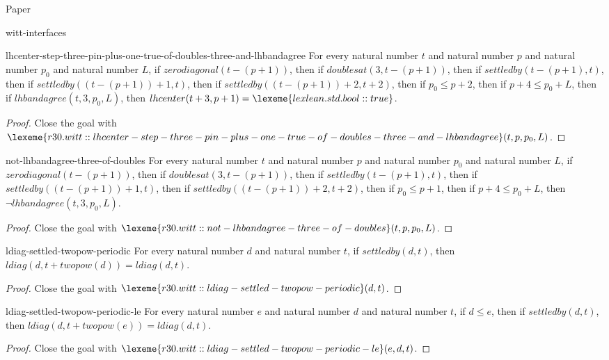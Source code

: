 \begin{lexlean}{Paper}
\begin{section}{witt-interfaces}
  \begin{theorem}{lhcenter-step-three-pin-plus-one-true-of-doubles-three-and-lhbandagree}
  For every natural number \(t\) and natural number \(p\) and natural number \(p_0\) and natural number \(L\), if \(zerodiagonal(t - (p + 1))\), then if \(doublesat(3, t - (p + 1))\), then if \(settledby(t - (p + 1), t)\), then if \(settledby((t - (p + 1)) + 1, t)\), then if \(settledby((t - (p + 1)) + 2, t + 2)\), then if \(p_0 ≤ p + 2\), then if \(p + 4 ≤ p_0 + L\), then if \(lhbandagree(t, 3, p_0, L)\), then \(lhcenter(t + 3, p + 1) = \lexeme{lexlean.std.bool::true}\).
  \begin{proof}
  Close the goal with \(\lexeme{r30.witt::lhcenter-step-three-pin-plus-one-true-of-doubles-three-and-lhbandagree}(t, p, p_0, L)\).
  \end{proof}
  \end{theorem}

  \begin{theorem}{not-lhbandagree-three-of-doubles}
  For every natural number \(t\) and natural number \(p\) and natural number \(p_0\) and natural number \(L\), if \(zerodiagonal(t - (p + 1))\), then if \(doublesat(3, t - (p + 1))\), then if \(settledby(t - (p + 1), t)\), then if \(settledby((t - (p + 1)) + 1, t)\), then if \(settledby((t - (p + 1)) + 2, t + 2)\), then if \(p_0 ≤ p + 1\), then if \(p + 4 ≤ p_0 + L\), then \(¬lhbandagree(t, 3, p_0, L)\).
  \begin{proof}
  Close the goal with \(\lexeme{r30.witt::not-lhbandagree-three-of-doubles}(t, p, p_0, L)\).
  \end{proof}
  \end{theorem}

  \begin{theorem}{ldiag-settled-twopow-periodic}
  For every natural number \(d\) and natural number \(t\), if \(settledby(d, t)\), then \(ldiag(d, t + twopow(d)) = ldiag(d, t)\).
  \begin{proof}
  Close the goal with \(\lexeme{r30.witt::ldiag-settled-twopow-periodic}(d, t)\).
  \end{proof}
  \end{theorem}

  \begin{theorem}{ldiag-settled-twopow-periodic-le}
  For every natural number \(e\) and natural number \(d\) and natural number \(t\), if \(d ≤ e\), then if \(settledby(d, t)\), then \(ldiag(d, t + twopow(e)) = ldiag(d, t)\).
  \begin{proof}
  Close the goal with \(\lexeme{r30.witt::ldiag-settled-twopow-periodic-le}(e, d, t)\).
  \end{proof}
  \end{theorem}


\end{section}
\end{lexlean}
